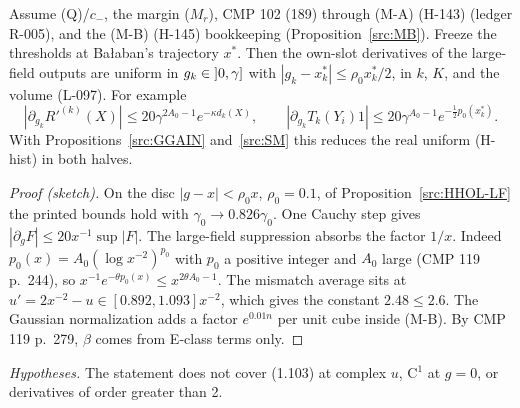 \begin{proposition}\label{src:GGAIN-LF}
Assume (Q)/$c_-$, the margin ($M_r$), CMP 102 (189) through (M-A) (H-143) (ledger R-005), and the (M-B) (H-145) bookkeeping (Proposition~\ref{src:MB}). Freeze the thresholds at Ba{\l}aban's trajectory $x^*$. Then the own-slot derivatives of the large-field outputs are uniform in $g_k\in\mathopen{]}0,\gamma\mathclose{]}$ with $|g_k-x^*_k|\le\rho_0x^*_k/2$, in $k$, $K$, and the volume (L-097). For example
\[|\partial_{g_k}R'^{(k)}(X)|\le20\gamma^{2A_0-1}e^{-\kappa d_k(X)},\qquad |\partial_{g_k}T_k(Y_i)1|\le20\gamma^{A_0-1}e^{-\frac12p_0(x^*_k)}.\]
With Propositions~\ref{src:GGAIN} and~\ref{src:SM} this reduces the real uniform (H-hist) in both halves.
\end{proposition}
\begin{proof}[Proof (sketch)]
On the disc $|g-x|<\rho_0x$, $\rho_0=0.1$, of Proposition~\ref{src:HHOL-LF} the printed bounds hold with $\gamma_0\to0.826\gamma_0$. One Cauchy step gives $|\partial_gF|\le20x^{-1}\sup|F|$. The large-field suppression absorbs the factor $1/x$. Indeed $p_0(x)=A_0(\log x^{-2})^{p_0}$ with $p_0$ a positive integer and $A_0$ large (CMP 119 p.~244), so $x^{-1}e^{-\theta p_0(x)}\le x^{2\theta A_0-1}$. The mismatch average sits at $u'=2x^{-2}-u\in[0.892,1.093]x^{-2}$, which gives the constant $2.48\le2.6$. The Gaussian normalization adds a factor $e^{0.01n}$ per unit cube inside (M-B). By CMP 119 p.~279, $\beta$ comes from E-class terms only.
\end{proof}
\emph{Hypotheses.} The statement does not cover (1.103) at complex $u$, C$^1$ at $g=0$, or derivatives of order greater than 2.

